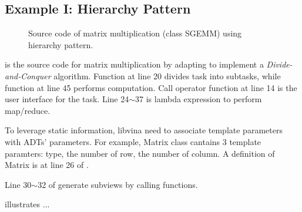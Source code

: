 \subsection{Example I: Hierarchy Pattern}

\renewcommand\linenumberfont{\normalfont\small}
\setlength\linenumbersep{-0.06in}

\begin{figure}[hbt]
  \caption{Source code of matrix multiplication (class SGEMM) using hierarchy pattern.}
  \label{fig:sgemm}
\end{figure}

 is the source code for matrix multiplication by adapting 
to implement a \emph{Divide-and-Conquer} algorithm. 
Function  at line 20 divides task into subtasks, while function  at
line 45 performs
computation. Call operator function at line 14 is the user interface for the task.
Line 24$\sim$37 is lambda expression to perform map/reduce.

To leverage static information, libvina need to
associate template parameters with ADTs' parameters. For example, 
Matrix class cantains 3 template paramters: type, the number of
row, the number of column. A definition of Matrix is at line 26 of
. 

Line 30$\sim$32 of  generate subviews by calling functions.

 illustrates ...


